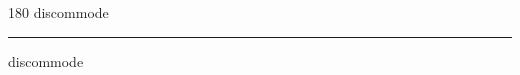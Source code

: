 
\begin{frame}
\begin{center}
\begin{turn}{180}
{\fontsize{2.5cm}{1em}\selectfont discommode}
\end{turn}
\vspace{1em}\par  
\hrule
\vspace{1em}\par  
{\fontsize{2.5cm}{1em}\selectfont discommode}
\end{center}
\end{frame}
